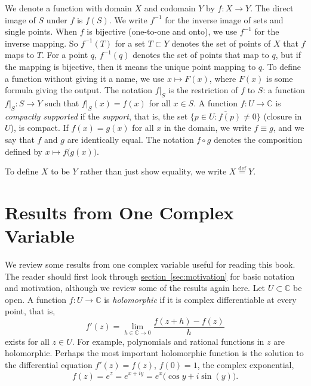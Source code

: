 \documentclass[12pt,openany]{book}
\newcommand{\C}{{\mathbb{C}}}
\newcommand{\myindex}[1]{#1\index{#1}}
\theoremstyle{plain}
\theoremstyle{remark}
\theoremstyle{definition}
\theoremstyle{exercise}
\theoremstyle{example}
\newcommand{\sectionref}[1]{\hyperref[#1]{section~\ref*{#1}}}
\begin{document}
%
We denote a function with domain $X$ and codomain $Y$ by
$f \colon X \to Y$.  The direct image of $S$ under $f$ is $f(S)$.
We write $f^{-1}$ for the inverse image of sets and
single points.  When $f$ is bijective (one-to-one and onto),
we use $f^{-1}$ for the inverse mapping.  So $f^{-1}(T)$ for
a set $T \subset Y$ denotes the set of points of $X$ that $f$ maps to $T$.
For a point $q$, $f^{-1}(q)$ denotes the set of points that map to $q$,
but if the mapping is bijective, then it means the unique point
mapping to $q$.
To define a function without giving it a name, we use
%
$x \mapsto F(x)$,
where $F(x)$ is some formula giving the output.
The notation
%
$f|_S$
is the restriction of $f$ to $S$:
a function
$f|_S \colon S \to Y$ such that $f|_S(x) = f(x)$ for all $x \in S$.
A function $f \colon U \to \C$ is
\emph{\myindex{compactly supported}} if
the \emph{\myindex{support}}, that is, the set
$\overline{\{ p \in U : f(p) \neq 0 \}}$ (closure in $U$), is compact.
If $f(x) = g(x)$ for all $x$ in the domain,
we write
%
$f \equiv g$,
and we say that $f$ and $g$ are identically equal.
The notation
%
$f \circ g$
denotes the composition defined by $x \mapsto
f\bigl(g(x)\bigr)$.

To define $X$ to be $Y$ rather than just show equality, we write
%
$X \overset{\text{def}}{=} Y$.



\chapter{Results from One Complex Variable} \label{ap:onevarresults}


We review some results from one complex variable useful for
reading this book.
The reader should first look through \sectionref{sec:motivation}
for basic notation and motivation, although we review some of the
results again here.
Let $U \subset \C$ be open.
A function
$f \colon U \to \C$ is \emph{holomorphic} if it is complex
differentiable at every point, that is,
\begin{equation*}
f'(z) = \lim_{h \in \C \to 0} \frac{f(z+h) - f(z)}{h}
\end{equation*}
exists for all $z \in U$.  For example, polynomials and rational
functions in $z$ are holomorphic.  Perhaps the most important holomorphic
function is the solution to the differential equation $f'(z) = f(z)$, $f(0) = 1$,
the complex exponential,
\begin{equation*}
f(z) = e^z = e^{x+iy} = e^x \bigl( \cos y + i \sin(y) \bigr) .
\end{equation*}
\end{document}
